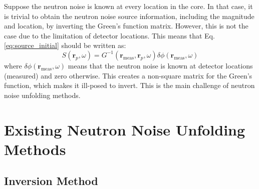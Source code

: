 Suppose the neutron noise is known at every location in the core. In that case, it is trivial to obtain the neutron noise source information, including the magnitude and location, by inverting the Green’s function matrix. However, this is not the case due to the limitation of detector locations. This means that Eq. \ref{eq:source_initial} should be written as:
\begin{equation}\label{eq:source_meas}
    S(\textbf{r}_p,\omega) = G^{-1}(\textbf{r}_{\text{meas}}, \textbf{r}_p,\omega) \delta \phi(\textbf{r}_{\text{meas}}, \omega)
\end{equation}
where $\delta \phi(\textbf{r}_{\text{meas}}, \omega)$ means that the neutron noise is known at detector locations (measured) and zero otherwise. This creates a non-square matrix for the Green’s function, which makes it ill-posed to invert. This is the main challenge of neutron noise unfolding methods.

\section{Existing Neutron Noise Unfolding Methods}

\subsection{Inversion Method}

